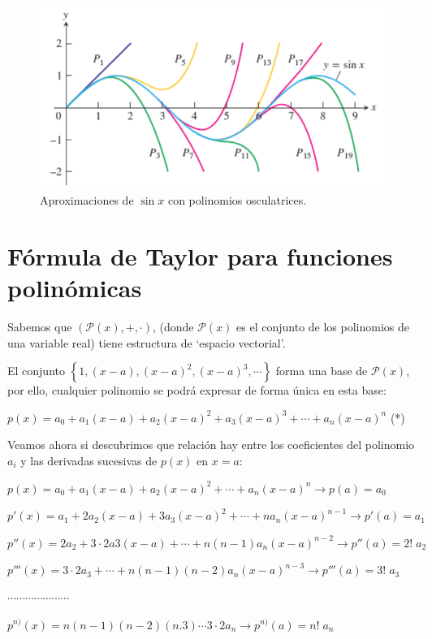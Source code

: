 	\begin{figure}[H]
		\centering
		\includegraphics[width=1\textwidth]{imagenes/imagenes06/T06IM06.png}
		\caption{Aproximaciones de $\sin x$ con polinomios osculatrices.}
	\end{figure}
	
	\section{Fórmula de Taylor para funciones polinómicas}
	
	Sabemos que $\left( \mathcal{P}(x), +, \cdot\right)$, (donde  $\mathcal{P}(x)$ es el conjunto de los polinomios de una variable real) tiene estructura de `espacio vectorial'. 
	
	El conjunto $\left\{1, (x-a),(x-a)^2,(x-a)^3,\cdots \right\}$ forma una base de $\mathcal{P}(x)$, por ello, cualquier polinomio se podrá expresar de forma única en esta base:
	
	$p(x)=a_0+a_1(x-a)+a_2(x-a)^2+a_3(x-a)^3+\cdots +a_n(x-a)^n$ (*)
	
	Veamos ahora si descubrimos que relación hay entre los coeficientes del polinomio $a_i$ y las derivadas sucesivas de $p(x)$ en $x=a$:
	
	$p(x)=a_0+a_1(x-a)+a_2(x-a)^2+\cdots +a_n(x-a)^n \to p(a)=a_0$
	
	$p'(x)=a_1+2a_2(x-a)+3a_3(x-a)^2+\cdots +n a_n(x-a)^{n-1} \to p'(a)=a_1$
	
	$p''(x)=2a_2+3\cdot 2 a3 (x-a)+ \cdots + n(n-1)a_n(x-a)^{n-2} \to p''(a)=2!\; a_2$
	
	$p'''(x)=3\cdot 2 a_3+ \cdots + n(n-1)(n-2)a_n (x-a)^{n-3}\to p'''(a)=3!\; a_3$
	
	$\cdots \cdots \cdots \cdots \cdots \cdots \cdots$
	
	$p^{n)}(x)=n(n-1)(n-2)(n.3)\cdots 3\cdot 2 a_n \to p^{n)}(a)=n!\; a_n  $
	
